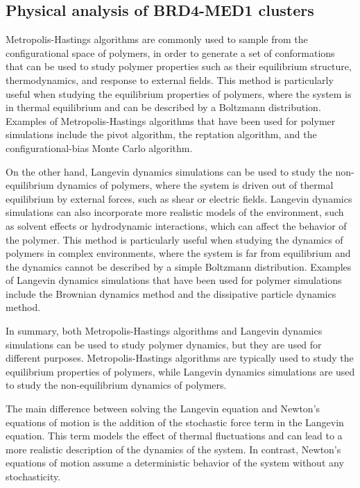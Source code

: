 \documentclass{ucetd}
\begin{document}
\subsection{Physical analysis of BRD4-MED1 clusters}

Metropolis-Hastings algorithms are commonly used to sample from the configurational space of polymers, in order to generate a set of conformations that can be used to study polymer properties such as their equilibrium structure, thermodynamics, and response to external fields. This method is particularly useful when studying the equilibrium properties of polymers, where the system is in thermal equilibrium and can be described by a Boltzmann distribution. Examples of Metropolis-Hastings algorithms that have been used for polymer simulations include the pivot algorithm, the reptation algorithm, and the configurational-bias Monte Carlo algorithm.

On the other hand, Langevin dynamics simulations can be used to study the non-equilibrium dynamics of polymers, where the system is driven out of thermal equilibrium by external forces, such as shear or electric fields. Langevin dynamics simulations can also incorporate more realistic models of the environment, such as solvent effects or hydrodynamic interactions, which can affect the behavior of the polymer. This method is particularly useful when studying the dynamics of polymers in complex environments, where the system is far from equilibrium and the dynamics cannot be described by a simple Boltzmann distribution. Examples of Langevin dynamics simulations that have been used for polymer simulations include the Brownian dynamics method and the dissipative particle dynamics method.

In summary, both Metropolis-Hastings algorithms and Langevin dynamics simulations can be used to study polymer dynamics, but they are used for different purposes. Metropolis-Hastings algorithms are typically used to study the equilibrium properties of polymers, while Langevin dynamics simulations are used to study the non-equilibrium dynamics of polymers.


The main difference between solving the Langevin equation and Newton's equations of motion is the addition of the stochastic force term in the Langevin equation. This term models the effect of thermal fluctuations and can lead to a more realistic description of the dynamics of the system. In contrast, Newton's equations of motion assume a deterministic behavior of the system without any stochasticity.
\end{document}
